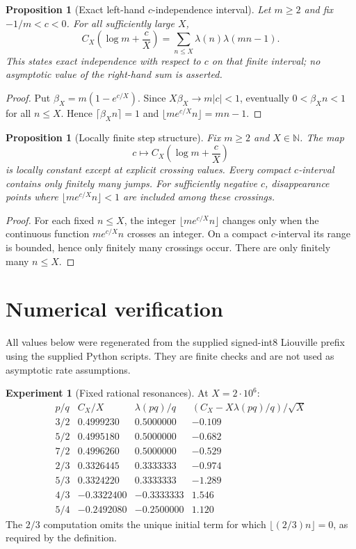 \documentclass[preprint,12pt]{elsarticle}
\numberwithin{equation}{section}
\theoremstyle{plain}
\newtheorem{proposition}[theorem]{Proposition}
\theoremstyle{definition}
\newtheorem{experiment}[theorem]{Experiment}
\theoremstyle{remark}
\begin{document}
\begin{proposition}[Exact left-hand $c$-independence interval]
\label{prop:left}
Let $m\ge2$ and fix $-1/m<c<0$. For all sufficiently large $X$,
\[
C_X\!\left(\log m+\frac cX\right)
=
\sum_{n\le X}\lambda(n)\lambda(mn-1).
\]
This states exact independence with respect to $c$ on that finite interval;
no asymptotic value of the right-hand sum is asserted.
\end{proposition}

\begin{proof}
Put $\beta_X=m(1-e^{c/X})$. Since $X\beta_X\to m|c|<1$, eventually
$0<\beta_Xn<1$ for all $n\le X$. Hence
$\lceil\beta_Xn\rceil=1$ and $\lfloor me^{c/X}n\rfloor=mn-1$.
\end{proof}

\begin{proposition}[Locally finite step structure]
Fix $m\ge2$ and $X\in\mathbb N$. The map
\[
c\longmapsto C_X\!\left(\log m+\frac cX\right)
\]
is locally constant except at explicit crossing values. Every compact
$c$-interval contains only finitely many jumps. For sufficiently negative
$c$, disappearance points where $\lfloor me^{c/X}n\rfloor<1$ are included
among these crossings.
\end{proposition}

\begin{proof}
For each fixed $n\le X$, the integer $\lfloor me^{c/X}n\rfloor$ changes only
when the continuous function $me^{c/X}n$ crosses an integer. On a compact
$c$-interval its range is bounded, hence only finitely many crossings occur.
There are only finitely many $n\le X$.
\end{proof}

\section{Numerical verification}
\label{sec:numerics}

All values below were regenerated from the supplied signed-int8 Liouville
prefix using the supplied Python scripts. They are finite checks and are not
used as asymptotic rate assumptions.

\begin{experiment}[Fixed rational resonances]
At $X=2\cdot10^6$:
\[
\begin{array}{c|r|r|r}
p/q & C_X/X & \lambda(pq)/q & (C_X-X\lambda(pq)/q)/\sqrt X\\ \hline
3/2 &  0.4999230 &  0.5000000 & -0.109\\
5/2 &  0.4995180 &  0.5000000 & -0.682\\
7/2 &  0.4996260 &  0.5000000 & -0.529\\
2/3 &  0.3326445 &  0.3333333 & -0.974\\
5/3 &  0.3324220 &  0.3333333 & -1.289\\
4/3 & -0.3322400 & -0.3333333 &  1.546\\
5/4 & -0.2492080 & -0.2500000 &  1.120
\end{array}
\]
The $2/3$ computation omits the unique initial term for which
$\lfloor(2/3)n\rfloor=0$, as required by the definition.
\end{experiment}
\end{document}
